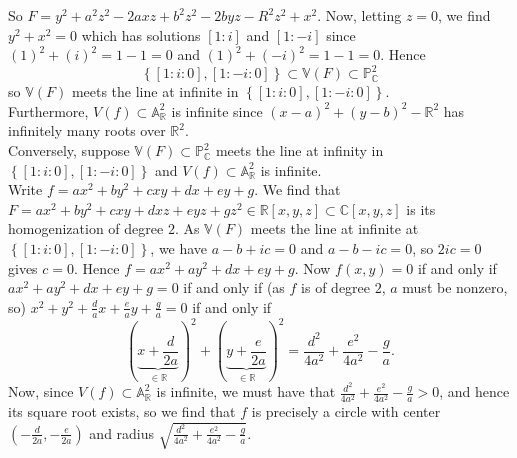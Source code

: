 \documentclass[a4paper]{article}
\begin{document}
     So $F = y^2 + a^2 z^2 - 2axz + b^2 z^2 - 2byz - R^2 z^2 + x^2$.
     Now, letting $z = 0$, we find
     $y^2 +x^2 = 0$ which has solutions
     $\left[ 1 : i \right] $ and $\left[ 1 : -i \right] $ since
     $(1)^2 + (i)^2 = 1-1 = 0$ and $(1)^2 + (-i)^2 = 1-1 = 0$. Hence
     \[
     \left\{ \left[ 1: i :0 \right] , \left[ 1 : -i : 0 \right]  \right\} 
     \subset \mathbb{V} (F) \subset \mathbb{P}_{\mathbb{C}}^2
     \] 
     so $\mathbb{V}(F)$ meets the line at infinite in
     $\left\{ \left[ 1 : i : 0 \right] , \left[ 1: -i : 0 \right]  \right\}
     $.\\
     Furthermore, $V(f) \subset \mathbb{A}_{\mathbb{R}}^2$ is infinite
     since $(x-a)^2 + (y-b)^2 - \mathbb{R}^2$ has infinitely many roots over
     $\mathbb{R}^2$.\\
     \linebreak
     Conversely, suppose $\mathbb{V}(F) \subset \mathbb{P}_{\mathbb{C}}^2$ 
     meets
     the line at infinity in $\left\{ \left[ 1:i:0 \right] , \left[ 1:-i:0 \right]  \right\} $ 
     and $V(f) \subset \mathbb{A}_{\mathbb{R}}^2$ is infinite.\\
     \linebreak
     Write $f = ax^2 + by^2 + cxy + dx + ey + g$. We find that
     $F = ax^2 + by^2 + cxy + dxz + eyz + gz^2 \in \mathbb{R}\left[ x,y,z \right] 
     \subset \mathbb{C}\left[ x,y,z \right] $ is its homogenization of degree
     $2$.
     As $\mathbb{V}(F)$ meets
     the line at infinite at $\left\{ \left[ 1:i:0 \right] ,\left[ 1:-i:0
     \right]  \right\} $,
      we have $a - b + ic = 0$ and
      $a - b - ic = 0$, so $2 ic = 0$ gives $c = 0$. Hence
      $f = ax^2 + ay^2 + dx + ey + g$.
      Now $f (x,y) = 0$ if and only if
      $ax^2 + ay^2 + dx +ey + g = 0$ if and only if (as $f$ is of degree $2$,
      $a$ must be nonzero, so)
      $x^2 + y^2 + \frac{d}{a}x + \frac{e}{a}y + \frac{g}{a} = 0$ if and only
      if
      $$\left(\underbrace{x + \frac{d}{2a}}_{\in \mathbb{R}} \right)^2 + \left(
          \underbrace{y + \frac{e}{2a}}_{\in \mathbb{R}}
          \right)^2
      =  \frac{d^2}{4a^2} + \frac{e^2}{4a^2} - \frac{g}{a}.
       $$ Now, since $V(f) \subset \mathbb{A}_{\mathbb{R}}^2$ is
      infinite, we must have that
      $\frac{d^2}{4a^2} + \frac{e^2}{4a^2} - \frac{g}{a} >0$, and hence its
      square root exists, so we find that
      $f$ is precisely a circle with center $\left( -\frac{d}{2a},
      -\frac{e}{2a} \right) $ and radius
      $\sqrt{\frac{d^2}{4a^2} + \frac{e^2}{4a^2} - \frac{g}{a}} $.


   

    
    
\end{document}
